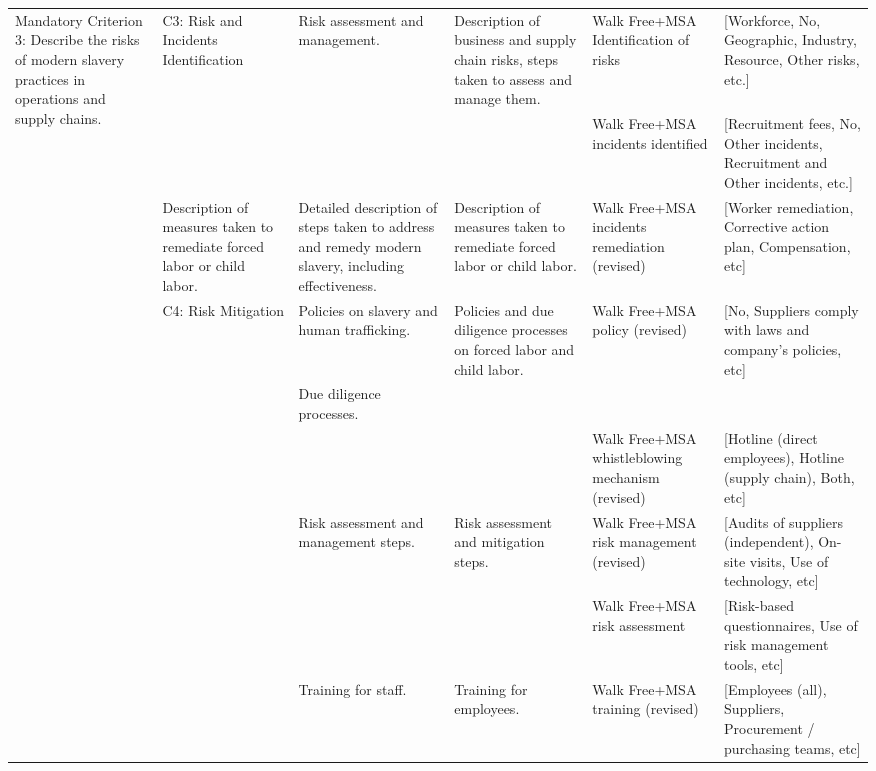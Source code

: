 \documentclass{article}
\begin{document}
\begin{landscape}
\begin{table}[ht]
\begin{tabular}{p{3cm}p{2cm}p{2.5cm}p{2.5cm}p{2.5cm}p{2cm}}
\multirow{4}{*}{Mandatory Criterion 3: Describe the risks of modern slavery practices in operations and supply chains.} 
& C3: Risk and Incidents Identification 
& Risk assessment and management. 
& Description of business and supply chain risks, steps taken to assess and manage them. 
& Walk Free+MSA Identification of risks 
& [Workforce, No, Geographic, Industry, Resource, Other risks, etc.] \\

& & & 
& Walk Free+MSA incidents identified 
& [Recruitment fees, No, Other incidents, Recruitment and Other incidents, etc.] \\

\multirow{5}{*}{Mandatory Criterion 4: Describe due diligence and remediation processes.} 
& Description of measures taken to remediate forced labor or child labor. 
& Detailed description of steps taken to address and remedy modern slavery, including effectiveness. 
& Description of measures taken to remediate forced labor or child labor. 
& Walk Free+MSA incidents remediation (revised) 
& [Worker remediation, Corrective action plan, Compensation, etc] \\

& C4: Risk Mitigation 
& Policies on slavery and human trafficking. 
& Policies and due diligence processes on forced labor and child labor. 
& Walk Free+MSA policy (revised) 
& [No, Suppliers comply with laws and company's policies, etc] \\

& & Due diligence processes. & & & \\

& & & 
& Walk Free+MSA whistleblowing mechanism (revised) 
& [Hotline (direct employees), Hotline (supply chain), Both, etc] \\

& & Risk assessment and management steps. 
& Risk assessment and mitigation steps. 
& Walk Free+MSA risk management (revised) 
& [Audits of suppliers (independent), On-site visits, Use of technology, etc] \\

\multirow{2}{*}{} 
& & & 
& Walk Free+MSA risk assessment 
& [Risk-based questionnaires, Use of risk management tools, etc] \\

& & Training for staff. 
& Training for employees. 
& Walk Free+MSA training (revised) 
& [Employees (all), Suppliers, Procurement / purchasing teams, etc] \\


\end{tabular}
\end{table}
\end{landscape}
\end{document}
